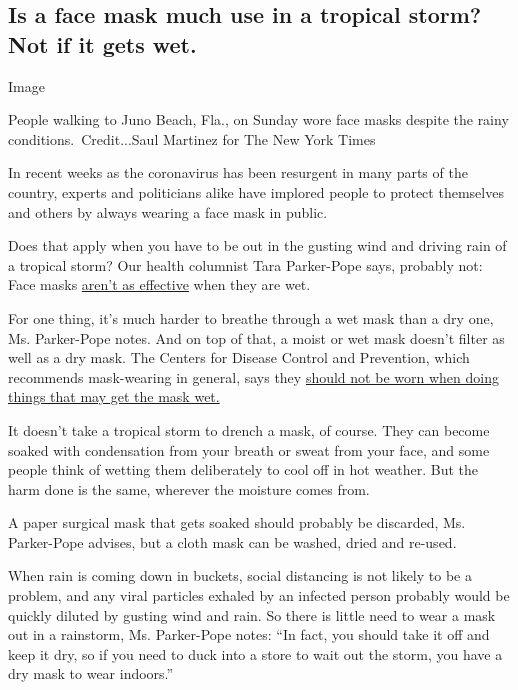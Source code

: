\hypertarget{is-a-face-mask-much-use-in-a-tropical-storm-not-if-it-gets-wet}{%
\subsection{Is a face mask much use in a tropical storm? Not if it gets
wet.}\label{is-a-face-mask-much-use-in-a-tropical-storm-not-if-it-gets-wet}}

Image

People walking to Juno Beach, Fla., on Sunday wore face masks despite
the rainy conditions.~Credit...Saul Martinez for The New York Times

In recent weeks as the coronavirus has been resurgent in many parts of
the country, experts and politicians alike have implored people to
protect themselves and others by always wearing a face mask in public.

Does that apply when you have to be out in the gusting wind and driving
rain of a tropical storm? Our health columnist Tara Parker-Pope says,
probably not: Face masks
\href{https://www.nursingtimes.net/clinical-archive/infection-control/the-effectiveness-of-surgical-face-masks-what-the-literature-shows-30-09-2003/}{aren't
as effective} when they are wet.

For one thing, it's much harder to breathe through a wet mask than a dry
one, Ms. Parker-Pope notes. And on top of that, a moist or wet mask
doesn't filter as well as a dry mask. The Centers for Disease Control
and Prevention, which recommends mask-wearing in general, says they
\href{https://www.cdc.gov/coronavirus/2019-ncov/prevent-getting-sick/cloth-face-cover-guidance.html}{should
not be worn when doing things that may get the mask wet.}

It doesn't take a tropical storm to drench a mask, of course. They can
become soaked with condensation from your breath or sweat from your
face, and some people think of wetting them deliberately to cool off in
hot weather. But the harm done is the same, wherever the moisture comes
from.

A paper surgical mask that gets soaked should probably be discarded, Ms.
Parker-Pope advises, but a cloth mask can be washed, dried and re-used.

When rain is coming down in buckets, social distancing is not likely to
be a problem, and any viral particles exhaled by an infected person
probably would be quickly diluted by gusting wind and rain. So there is
little need to wear a mask out in a rainstorm, Ms. Parker-Pope notes:
``In fact, you should take it off and keep it dry, so if you need to
duck into a store to wait out the storm, you have a dry mask to wear
indoors.''

